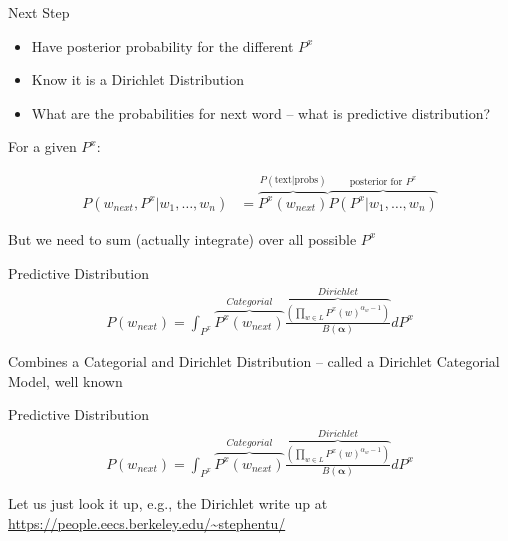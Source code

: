 \documentclass[11pt]{beamer}
\begin{document}
	\begin{frame}{Next Step}
		\begin{itemize}
			\item Have posterior probability for the different $P^{x}$
			\item Know it is a Dirichlet Distribution
			\item What are the probabilities for next word -- what is predictive distribution?
		\end{itemize}
	\end{frame}
	
	\begin{frame}
		For a given $P^x$:
		
		\begin{align*}
			P(w_{next},P^x|w_1,\dots,w_n) & = \overbrace{P^{x}(w_{next})}^{P(\text{text}|\text{probs})}\overbrace{P(P^x|w_1,\dots,w_n)}^{\text{posterior for $P^x$}}
		\end{align*}
		
		But we need to sum (actually integrate) over all possible $P^x$
	\end{frame}
	
	\begin{frame}{Predictive Distribution}
		\begin{align*}
			P(w_{next}) = \int_{P^x} \overbrace{P^x(w_{next})}^{Categorial} \overbrace{\frac{\left(\prod_{w \in L} P^{x}(w)^{\alpha_{w}-1}\right)}{B(\boldsymbol{\alpha})}}^{Dirichlet} d P^x
		\end{align*}
			
		\vspace{10pt} Combines a Categorial and Dirichlet Distribution -- called a Dirichlet Categorial Model, well known
	\end{frame}
	
	\begin{frame}{Predictive Distribution}
		\begin{align*}
			P(w_{next}) = \int_{P^x} \overbrace{P^x(w_{next})}^{Categorial} \overbrace{\frac{\left(\prod_{w \in L} P^{x}(w)^{\alpha_{w}-1}\right)}{B(\boldsymbol{\alpha})}}^{Dirichlet} d P^x
		\end{align*}
		
		\vspace{10pt} Let us just look it up, e.g., the Dirichlet write up at \url{https://people.eecs.berkeley.edu/~stephentu/} 
	\end{frame}
	
\end{document}

